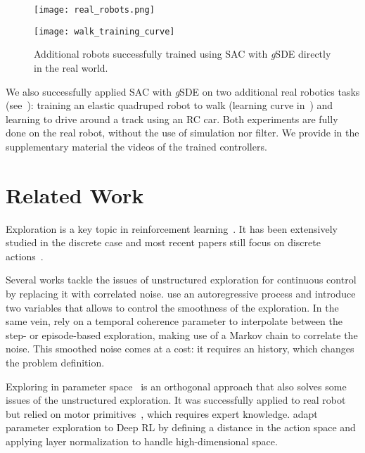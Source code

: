 \documentclass{article}
\newcommand{\ourSDE}{\textit{g}\textsc{SDE}\xspace}
\newcommand{\sac}{\textsc{SAC}\xspace}
\begin{document}
\begin{figure}[h]
  \begin{minipage}[t]{.48\linewidth}
    \centering\texttt{[image: real\_robots.png]}
    \label{fig:robots}
  \end{minipage}
  \begin{minipage}[t]{.48\linewidth}
    \centering\texttt{[image: walk\_training\_curve]}
    \label{fig:training-bert}
  \end{minipage}
  \caption{Additional robots successfully trained using \sac with \ourSDE directly in the real world.}
\end{figure}

We also successfully applied \sac with \ourSDE on two additional real robotics tasks (see~): training an elastic quadruped robot to walk (learning curve in~) and learning to drive around a track using an RC car.
Both experiments are fully done on the real robot, without the use of simulation nor filter.
We provide in the supplementary material the videos of the trained controllers.


\section{Related Work}



Exploration is a key topic in reinforcement learning~\citep{sutton2018reinforcement}. It has been extensively studied in the discrete case and most recent papers still focus on discrete actions~\citep{osband2016deep, osband2018randomized}.

Several works tackle the issues of unstructured exploration for continuous control by replacing it with correlated noise. \citet{korenkevych2019autoregressive} use an autoregressive process and introduce two variables that allows to control the smoothness of the exploration. In the same vein, \citet{hoof2017generalized} rely on a temporal coherence parameter to interpolate between the step- or episode-based exploration, making use of a Markov chain to correlate the noise. This smoothed noise comes at a cost: it requires an history, which changes the problem definition.

Exploring in parameter space~\citep{kober2009policy, sehnke2010parameter, ruckstiess2010exploring, stulp2013robot, sigaud2019policy} is an orthogonal approach that also solves some issues of the unstructured exploration. It was successfully applied to real robot but relied on motor primitives~\citep{peters2008reinforcement, stulp2013robot}, which requires expert knowledge.
\citet{plappert2017parameter} adapt parameter exploration to Deep RL by defining a distance in the action space and applying layer normalization to handle high-dimensional space.
\end{document}
